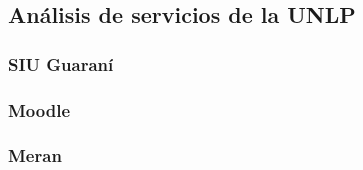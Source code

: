 \subsection{Análisis de servicios de la UNLP}
\label{analisis_servicios_unlp}

\subsubsection{SIU Guaraní}
\label{guarani}

\subsubsection{Moodle}
\label{moodle}

\subsubsection{Meran}
\label{merans}